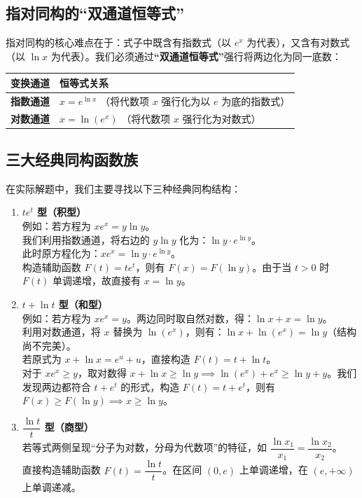 \documentclass[11pt,a4paper]{ctexart}
\begin{document}
\subsection{指对同构的“双通道恒等式”}
指对同构的核心难点在于：式子中既含有指数式（以 $e^x$ 为代表），又含有对数式（以 $\ln x$ 为代表）。我们必须通过\textbf{“双通道恒等式”}强行将两边化为同一底数：

\begin{center}
\renewcommand{\arraystretch}{1.5}
\begin{tabularx}{0.8\linewidth}{c X}
\toprule
\textbf{变换通道} & \textbf{恒等式关系} \\
\midrule
\textbf{指数通道} & $x = e^{\ln x}$ （将代数项 $x$ 强行化为以 $e$ 为底的指数式） \\
\textbf{对数通道} & $x = \ln(e^x)$ （将代数项 $x$ 强行化为对数式） \\
\bottomrule
\end{tabularx}
\end{center}

\subsection{三大经典同构函数族}
在实际解题中，我们主要寻找以下三种经典同构结构：

\begin{enumerate}
  \item \textbf{$t e^t$ 型（积型）} \\
    例如：若方程为 $x e^x = y \ln y$。\\
    我们利用指数通道，将右边的 $y \ln y$ 化为：$\ln y \cdot e^{\ln y}$。\\
    此时原方程化为：$x e^x = \ln y \cdot e^{\ln y}$。\\
    构造辅助函数 $F(t) = t e^t$，则有 $F(x) = F(\ln y)$。由于当 $t > 0$ 时 $F(t)$ 单调递增，故直接有 $\boxed{x = \ln y}$。
    
  \item \textbf{$t + \ln t$ 型（和型）} \\
    例如：若方程为 $x e^x = y$。两边同时取自然对数，得：$\ln x + x = \ln y$。\\
    利用对数通道，将 $x$ 替换为 $\ln(e^x)$，则有：$\ln x + \ln(e^x) = \ln y$（结构尚不完美）。\\
    若原式为 $x + \ln x = e^u + u$，直接构造 $F(t) = t + \ln t$。\\
    对于 $x e^x \ge y$，取对数得 $x + \ln x \ge \ln y \implies \ln(e^x) + e^x \ge \ln y + y$。我们发现两边都符合 $t + e^t$ 的形式，构造 $F(t) = t + e^t$，则有 $F(x) \ge F(\ln y) \implies \boxed{x \ge \ln y}$。
    
  \item \textbf{$\dfrac{\ln t}{t}$ 型（商型）} \\
    若等式两侧呈现“分子为对数，分母为代数项”的特征，如 $\dfrac{\ln x_1}{x_1} = \dfrac{\ln x_2}{x_2}$。\\
    直接构造辅助函数 $F(t) = \dfrac{\ln t}{t}$。在区间 $(0, e)$ 上单调递增，在 $(e, +\infty)$ 上单调递减。
\end{enumerate}
\end{document}
